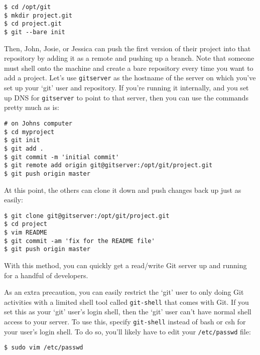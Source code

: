 \documentclass[a4paper]{book}
\begin{document}
\begin{shaded}\begin{verbatim}
$ cd /opt/git
$ mkdir project.git
$ cd project.git
$ git --bare init
\end{verbatim}\end{shaded}

Then, John, Josie, or Jessica can push the first version of their project into that repository by adding it as a remote and pushing up a branch. Note that someone must shell onto the machine and create a bare repository every time you want to add a project. Let's use \texttt{gitserver} as the hostname of the server on which you've set up your `git' user and repository. If you're running it internally, and you set up DNS for \texttt{gitserver} to point to that server, then you can use the commands pretty much as is:

\begin{shaded}\begin{verbatim}
# on Johns computer
$ cd myproject
$ git init
$ git add .
$ git commit -m 'initial commit'
$ git remote add origin git@gitserver:/opt/git/project.git
$ git push origin master
\end{verbatim}\end{shaded}

At this point, the others can clone it down and push changes back up just as easily:

\begin{shaded}\begin{verbatim}
$ git clone git@gitserver:/opt/git/project.git
$ cd project
$ vim README
$ git commit -am 'fix for the README file'
$ git push origin master
\end{verbatim}\end{shaded}

With this method, you can quickly get a read/write Git server up and running for a handful of developers.

As an extra precaution, you can easily restrict the `git' user to only doing Git activities with a limited shell tool called \texttt{git-shell} that comes with Git. If you set this as your `git' user's login shell, then the `git' user can't have normal shell access to your server. To use this, specify \texttt{git-shell} instead of bash or csh for your user's login shell. To do so, you'll likely have to edit your \texttt{/etc/passwd} file:

\begin{shaded}\begin{verbatim}
$ sudo vim /etc/passwd
\end{verbatim}\end{shaded}
\end{document}
